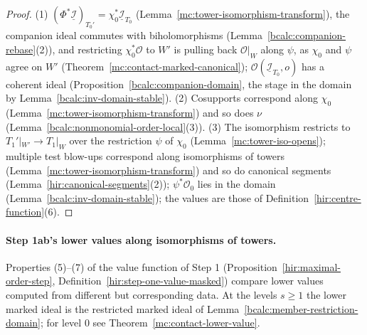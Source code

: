 \begin{proof}
\mixedleanok
(1) \((\Phi^*\underline{\mathcal I})_{T_0'}=\chi_0^*\underline{\mathcal I}_{T_0}\) (Lemma~\ref{mc:tower-isomorphism-transform}), the companion ideal commutes with biholomorphisms
(Lemma~\ref{bcalc:companion-rebase}(2)), and restricting \(\chi_0^*\mathcal O\) to \(W'\) is pulling back \(\mathcal O|_W\) along \(\psi\), as \(\chi_0\) and \(\psi\) agree on \(W'\)
(Theorem~\ref{mc:contact-marked-canonical}); \(\mathcal O(\underline{\mathcal I}_{T_0},o)\) has a coherent ideal (Proposition~\ref{bcalc:companion-domain}, the stage in the domain by
Lemma~\ref{bcalc:inv-domain-stable}). (2) Cosupports correspond along \(\chi_0\) (Lemma~\ref{mc:tower-isomorphism-transform}) and so does \(\nu\)
(Lemma~\ref{bcalc:nonmonomial-order-local}(3)). (3) The isomorphism restricts to \(T_1'|_{W'}\to T_1|_W\) over the restriction \(\psi\) of \(\chi_0\) (Lemma~\ref{mc:tower-iso-opens});
multiple test blow-ups correspond along isomorphisms of towers (Lemma~\ref{mc:tower-isomorphism-transform}) and so do canonical segments
(Lemma~\ref{hir:canonical-segments}(2)); \(\psi^*\mathcal O_0\) lies in the domain (Lemma~\ref{bcalc:inv-domain-stable}); the values are those of
Definition~\ref{hir:centre-function}(6).
\end{proof}

\paragraph{Step 1ab's lower values along isomorphisms of towers.} Properties (5)--(7) of the value function of Step 1
(Proposition~\ref{hir:maximal-order-step}, Definition~\ref{hir:step-one-value-masked}) compare lower values computed from different but corresponding data.
At the levels \(s\ge1\) the lower marked ideal is the restricted marked ideal of Lemma~\ref{bcalc:member-restriction-domain}; for level \(0\) see
Theorem~\ref{mc:contact-lower-value}.

